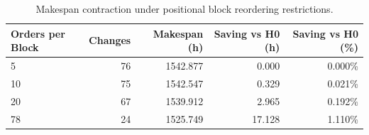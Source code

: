 \begin{table}[!htbp]
\centering
\caption{Makespan contraction under positional block reordering restrictions.}
\label{tab:sensitivity_blocks}
\renewcommand{\arraystretch}{1.15}
\small
\begin{tabularx}{\textwidth}{Xrrrr}
\toprule
\textbf{Orders per Block} & \textbf{Changes} & \textbf{Makespan (h)} & \textbf{Saving vs H0 (h)} & \textbf{Saving vs H0 (\%)} \\
\midrule
5 & 76 & 1542.877 & 0.000 & 0.000\% \\
10 & 75 & 1542.547 & 0.329 & 0.021\% \\
20 & 67 & 1539.912 & 2.965 & 0.192\% \\
78 & 24 & 1525.749 & 17.128 & 1.110\% \\
\bottomrule
\end{tabularx}
\end{table}
